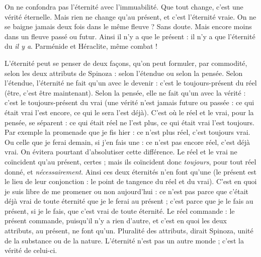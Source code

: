 On ne confondra pas l'éternité avec l’immuabilité. Que tout change, c’est
une vérité éternelle. Mais rien ne change qu’au présent, et c’est l’éternité vraie.
On ne se baigne jamais deux fois dans le même fleuve ? Sans doute. Mais
encore moins dans un fleuve passé ou futur. Ainsi il n’y a que le présent : il n’y
a que l'éternité du {\it il y a}. Parménide et Héraclite, même combat !

L’éternité peut se penser de deux façons, qu’on peut formuler, par commodité,
selon les deux attributs de Spinoza : selon l’étendue ou selon la pensée.
Selon l'étendue, l'éternité ne fait qu’un avec le devenir : c’est le toujours-présent
du réel (être, c’est être maintenant). Selon la pensée, elle ne fait qu’un avec
la vérité : c’est le toujours-présent du vrai (une vérité n’est jamais future ou
passée : ce qui était vrai l’est encore, ce qui le sera l’est déjà). C’est où le réel et
le vrai, pour la pensée, se séparent : ce qui était réel ne l’est plus, ce qui était vrai
l’est toujours. Par exemple la promenade que je fis hier : ce n’est plus réel, c’est
toujours vrai. Ou celle que je ferai demain, si j’en fais une : ce n’est pas encore
réel, c’est déjà vrai. On évitera pourtant d’absolutiser cette différence. Le réel et
le vrai ne coïncident qu’au présent, certes ; mais ils coïncident donc {\it toujours},
pour tout réel donné, et {\it nécessairement}. Ainsi ces deux éternités n’en font
qu'une (le présent est le lieu de leur conjonction : le point de tangence du réel
et du vrai). C’est en quoi je suis libre de me promener ou non aujourd’hui : ce
n'est pas parce que c'était déjà vrai de toute éternité que je le ferai au présent ;
c'est parce que je le fais au présent, si je le fais, que c’est vrai de toute éternité.
Le réel commande : le présent commande, puisqu'il n’y a rien d’autre, et c’est
en quoi les deux attributs, au présent, ne font qu’un. Pluralité des attributs,
dirait Spinoza, unité de la substance ou de la nature. L’éternité n’est pas un
autre monde ; c’est la vérité de celui-ci.

